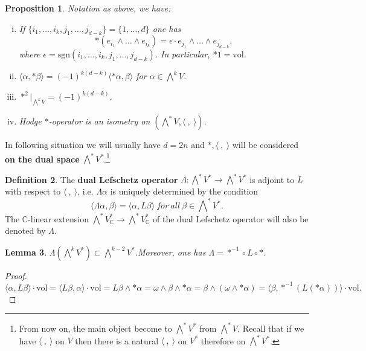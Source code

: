 \documentclass{article}
\theoremstyle{definition}
\newtheorem{definition}{Definition}[subsection]
\theoremstyle{plain}
\newtheorem{lemma}[definition]{Lemma}
\newtheorem{proposition}[definition]{Proposition}
\begin{document}
\begin{proposition}
    Notation as above, we have:
    \begin{enumerate}[(i)]
        \item If $ \{i_1,\dots,i_k,j_1,\dots,j_{d-k} \}=\{1,\dots,d\} $ one has\[
            *(e_{i_1}\wedge\dots\wedge e_{i_k})=\epsilon\cdot e_{j_1}\wedge\dots\wedge e_{j_{d-k}},
        \]where $ \epsilon=\mathrm{sgn}(i_1,\dots,i_k,j_1,\dots,j_{d-k}) $. In particular, $ *1=\mathrm{vol} $.
        \item $ \langle\alpha,*\beta\rangle=(-1)^{k(d-k)}\langle*\alpha,\beta\rangle $ for $ \alpha\in\bigwedge^k V $.
        \item $ *^2|_{\bigwedge^k V}=(-1)^{k(d-k)} $.
        \item Hodge $ * $-operator is an isometry on $ (\bigwedge^* V,\langle\ ,\ \rangle) $.
    \end{enumerate}
\end{proposition}

In following situation we will usually have $ d=2n $ and $ *,\langle\ ,\ \rangle $ will be considered \textbf{on the dual space} $ \bigwedge^* V^* $.\footnote{From now on, the main object become to $ \bigwedge^* V^* $ from $ \bigwedge^* V $. Recall that if we have $ \langle\ ,\ \rangle $ on $ V $ then there is a natural $ \langle\ ,\ \rangle $ on $ V^* $ therefore on $ \bigwedge^* V^* $.\label{dual}}

\begin{definition}
    The \textbf{dual Lefschetz operator} $ \varLambda:\bigwedge^* V^*\rightarrow\bigwedge^* V^* $ is adjoint to $ L $ with respect to $ \langle\ ,\ \rangle $, i.e. $ \Lambda\alpha $ is uniquely determined by the condition\[
        \langle\varLambda\alpha,\beta\rangle=\langle\alpha,L\beta\rangle\ for\ all\ \beta\in\bigwedge\nolimits^* V^*.
    \]The $ \mathbb{C} $-linear extension $ \bigwedge^* V_{\mathbb{C}}^*\rightarrow\bigwedge^*V_{\mathbb{C}}^* $ of the dual Lefschetz operator will also be denoted by $ \varLambda $.
\end{definition}

\begin{lemma}
    $ \varLambda(\bigwedge^k V^*)\subset\bigwedge^{k-2}V^* $.Moreover, one has $ \varLambda=*^{-1}\circ L\circ * $.
\end{lemma}

\begin{proof}
    \[
        \langle\alpha,L\beta\rangle\cdot\mathrm{vol}=\langle L\beta,\alpha\rangle\cdot\mathrm{vol}=L\beta\wedge*\alpha=\omega\wedge\beta\wedge*\alpha=\beta\wedge(\omega\wedge*\alpha)=\langle\beta,*^{-1}(L(*\alpha))\rangle\cdot\mathrm{vol}.
    \]
\end{proof}
\end{document}

